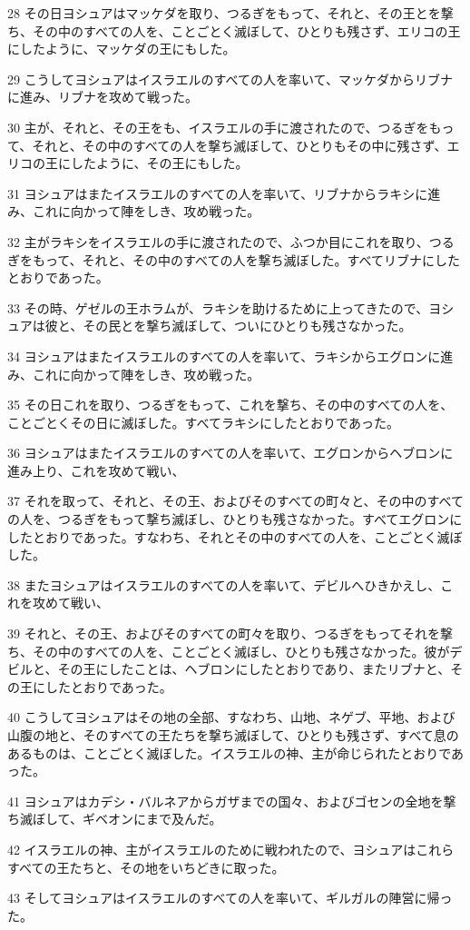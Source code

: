 \par 28 その日ヨシュアはマッケダを取り、つるぎをもって、それと、その王とを撃ち、その中のすべての人を、ことごとく滅ぼして、ひとりも残さず、エリコの王にしたように、マッケダの王にもした。
\par 29 こうしてヨシュアはイスラエルのすべての人を率いて、マッケダからリブナに進み、リブナを攻めて戦った。
\par 30 主が、それと、その王をも、イスラエルの手に渡されたので、つるぎをもって、それと、その中のすべての人を撃ち滅ぼして、ひとりもその中に残さず、エリコの王にしたように、その王にもした。
\par 31 ヨシュアはまたイスラエルのすべての人を率いて、リブナからラキシに進み、これに向かって陣をしき、攻め戦った。
\par 32 主がラキシをイスラエルの手に渡されたので、ふつか目にこれを取り、つるぎをもって、それと、その中のすべての人を撃ち滅ぼした。すべてリブナにしたとおりであった。
\par 33 その時、ゲゼルの王ホラムが、ラキシを助けるために上ってきたので、ヨシュアは彼と、その民とを撃ち滅ぼして、ついにひとりも残さなかった。
\par 34 ヨシュアはまたイスラエルのすべての人を率いて、ラキシからエグロンに進み、これに向かって陣をしき、攻め戦った。
\par 35 その日これを取り、つるぎをもって、これを撃ち、その中のすべての人を、ことごとくその日に滅ぼした。すべてラキシにしたとおりであった。
\par 36 ヨシュアはまたイスラエルのすべての人を率いて、エグロンからヘブロンに進み上り、これを攻めて戦い、
\par 37 それを取って、それと、その王、およびそのすべての町々と、その中のすべての人を、つるぎをもって撃ち滅ぼし、ひとりも残さなかった。すべてエグロンにしたとおりであった。すなわち、それとその中のすべての人を、ことごとく滅ぼした。
\par 38 またヨシュアはイスラエルのすべての人を率いて、デビルへひきかえし、これを攻めて戦い、
\par 39 それと、その王、およびそのすべての町々を取り、つるぎをもってそれを撃ち、その中のすべての人を、ことごとく滅ぼし、ひとりも残さなかった。彼がデビルと、その王にしたことは、ヘブロンにしたとおりであり、またリブナと、その王にしたとおりであった。
\par 40 こうしてヨシュアはその地の全部、すなわち、山地、ネゲブ、平地、および山腹の地と、そのすべての王たちを撃ち滅ぼして、ひとりも残さず、すべて息のあるものは、ことごとく滅ぼした。イスラエルの神、主が命じられたとおりであった。
\par 41 ヨシュアはカデシ・バルネアからガザまでの国々、およびゴセンの全地を撃ち滅ぼして、ギベオンにまで及んだ。
\par 42 イスラエルの神、主がイスラエルのために戦われたので、ヨシュアはこれらすべての王たちと、その地をいちどきに取った。
\par 43 そしてヨシュアはイスラエルのすべての人を率いて、ギルガルの陣営に帰った。


